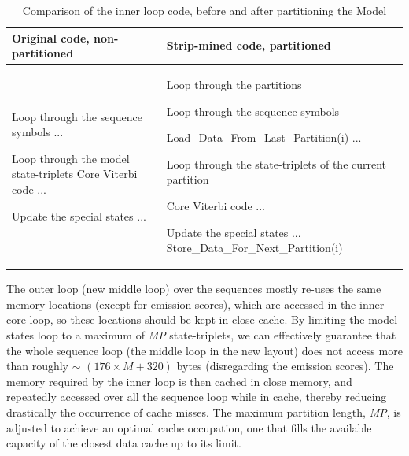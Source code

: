 \begin{table}[htb!]
\centering
\caption[Inner loop code, before and after partitioning] {Comparison of the inner loop code, before and after partitioning the Model}
\label{table-partitioning-comp}

\begin{tabularx}{\textwidth}{ |X|X| }
\hline
Original code, non-partitioned  &  Strip-mined code, partitioned   \\ \hline

\begin{algorithmic}
\LeftComment Loop through the sequence symbols
\For {$i \gets 1 \textrm{ to } SequenceLength \ (L) $} 
	\State ...		

	\LeftComment Loop through the model state-triplets
	\For {$i \gets 0 \textrm{ to } M-1 $} 
		\LeftComment Core Viterbi code
		\State ...
	\EndFor
	
	\LeftComment Update the special states
	\State ...	
\EndFor
\end{algorithmic}

&
\begin{algorithmic}
\LeftComment  Loop through the partitions
\For {$i \gets 1 \textrm{ to } Npartitions $} 
	
	\LeftComment Loop through the sequence symbols
	\For {$i \gets 1 \textrm{ to } SequenceLength \ (L) $} 
	
		\State Load\_Data\_From\_Last\_Partition(i)
		\State ...		

		\LeftComment Loop through the state-triplets
		\LeftComment of the current partition

		\For {$i \gets 0 \textrm{ to } MP $} 
			\LeftComment Core Viterbi code
			\State ...
		\EndFor
	
		\LeftComment Update the special states
		\State ...	
		\State Store\_Data\_For\_Next\_Partition(i)
	\EndFor
	
\EndFor
\end{algorithmic}

\\ \hline
\end{tabularx}
\end{table}



The outer loop (new middle loop) over the sequences mostly re-uses the same memory locations (except for emission scores), which are accessed in the inner core loop, so these locations should be kept in close cache.
By limiting the model states loop to a maximum of \emph{MP} state-triplets, we can effectively guarantee that the whole sequence loop (the middle loop in the new layout) does not access more than roughly $\sim$ $(176 \times M + 320)$ bytes (disregarding the emission scores). The memory required by the inner loop is then cached in close memory, and repeatedly accessed over all the sequence loop while in cache, thereby reducing drastically the occurrence of cache misses.
The maximum partition length, \emph{MP}, is adjusted to achieve an optimal cache occupation, one that fills the available capacity of the closest data cache up to its limit.

